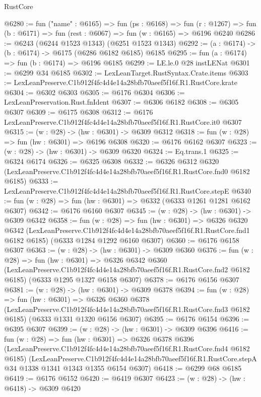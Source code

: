 \begin{lexlean}{RustCore}
\begin{coremodule}
@6280 := fun ("name" : @6165) =>
  fun (ps : @6168) =>
  fun (r : @1267) => fun (b : @6171) => fun (rest : @6067) => fun (w : @6165) => @6196 @6240
@6286 := @6243 (@6244 @1523 @1343) (@6251 @1523 @1343)
@6292 := (a : @6174) -> (b : @6174) -> @6175 (@6286 @6182 @6185) @6185
@6295 := fun (a : @6174) => fun (b : @6174) => @6196 @6185
@6299 := LE.le.{0} @28 instLENat
@6301 := @6299 @34 @6185
@6302 := LexLeanTarget.RustSyntax.Crate.items
@6303 := LexLeanPreserve.C1b912f4fc4d4e14a28bfb70aeef5f16f.R1.RustCore.krate
@6304 := @6302 @6303
@6305 := @6176 @6304
@6306 := LexLeanPreservation.Rust.fnIdent
@6307 := @6306 @6182
@6308 := @6305 @6307
@6309 := @6175 @6308
@6312 := @6176 LexLeanPreserve.C1b912f4fc4d4e14a28bfb70aeef5f16f.R1.RustCore.it0 @6307
@6315 := (w : @28) -> (hw : @6301) -> @6309 @6312
@6318 := fun (w : @28) => fun (hw : @6301) => @6196 @6308
@6320 := @6176 @6162 @6307
@6323 := (w : @28) -> (hw : @6301) -> @6309 @6320
@6324 := Eq.trans.{1}
@6325 := @6324 @6174
@6326 := @6325 @6308
@6332 := @6326
    @6312
    @6320
    (LexLeanPreserve.C1b912f4fc4d4e14a28bfb70aeef5f16f.R1.RustCore.fnd0 @6182 @6185)
@6333 := LexLeanPreserve.C1b912f4fc4d4e14a28bfb70aeef5f16f.R1.RustCore.stepE
@6340 := fun (w : @28) => fun (hw : @6301) => @6332 (@6333 @1261 @1281 @6162 @6307)
@6342 := @6176 @6160 @6307
@6345 := (w : @28) -> (hw : @6301) -> @6309 @6342
@6358 := fun (w : @28) =>
  fun (hw : @6301) =>
  @6326
    @6320
    @6342
    (LexLeanPreserve.C1b912f4fc4d4e14a28bfb70aeef5f16f.R1.RustCore.fnd1 @6182 @6185)
    (@6333 @1284 @1292 @6160 @6307)
@6360 := @6176 @6158 @6307
@6363 := (w : @28) -> (hw : @6301) -> @6309 @6360
@6376 := fun (w : @28) =>
  fun (hw : @6301) =>
  @6326
    @6342
    @6360
    (LexLeanPreserve.C1b912f4fc4d4e14a28bfb70aeef5f16f.R1.RustCore.fnd2 @6182 @6185)
    (@6333 @1295 @1327 @6158 @6307)
@6378 := @6176 @6156 @6307
@6381 := (w : @28) -> (hw : @6301) -> @6309 @6378
@6394 := fun (w : @28) =>
  fun (hw : @6301) =>
  @6326
    @6360
    @6378
    (LexLeanPreserve.C1b912f4fc4d4e14a28bfb70aeef5f16f.R1.RustCore.fnd3 @6182 @6185)
    (@6333 @1331 @1320 @6156 @6307)
@6395 := @6176 @6154
@6396 := @6395 @6307
@6399 := (w : @28) -> (hw : @6301) -> @6309 @6396
@6416 := fun (w : @28) =>
  fun (hw : @6301) =>
  @6326
    @6378
    @6396
    (LexLeanPreserve.C1b912f4fc4d4e14a28bfb70aeef5f16f.R1.RustCore.fnd4 @6182 @6185)
    (LexLeanPreserve.C1b912f4fc4d4e14a28bfb70aeef5f16f.R1.RustCore.stepA
      @34
      @1338
      @1341
      @1343
      @1355
      @6154
      @6307)
@6418 := @6299 @68 @6185
@6419 := @6176 @6152
@6420 := @6419 @6307
@6423 := (w : @28) -> (hw : @6418) -> @6309 @6420

\end{coremodule}
\end{lexlean}
